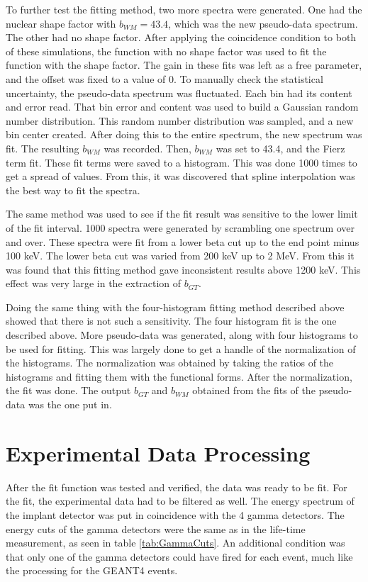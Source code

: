 \documentclass[../MaxHughesThesis.tex]{subfiles}
\begin{document}
To further test the fitting method, two more spectra were generated.
One had the nuclear shape factor with $b_{WM} = 43.4$, which was the new pseudo-data spectrum.  
The other had no shape factor.
After applying the coincidence condition to both of these simulations, the function with no shape factor was used to fit the function with the shape factor. 
The gain in these fits was left as a free parameter, and the offset was fixed to a value of 0. 
To manually check the statistical uncertainty, the pseudo-data spectrum was fluctuated.
Each bin had its content and error read. 
That bin error and content was used to build a Gaussian random number distribution.
This random number distribution was sampled, and a new bin center created.
After doing this to the entire spectrum, the new spectrum was fit.
The resulting $b_{WM}$ was recorded.
Then, $b_{WM}$ was set to 43.4, and the Fierz term fit. 
These fit terms were saved to a histogram.
This was done 1000 times to get a spread of values.
From this, it was discovered that spline interpolation was the best way to fit the spectra.

The same method was used to see if the fit result was sensitive to the lower limit of the fit interval. 
1000 spectra were generated by scrambling one spectrum over and over.
These spectra were fit from a lower beta cut up to the end point minus 100 keV.
The lower beta cut was varied from 200 keV up to 2 MeV.
From this it was found that this fitting method gave inconsistent results above 1200 keV. 
This effect was very large in the extraction of $b_{GT}$.

Doing the same thing with the four-histogram fitting method described above showed that there is not such a sensitivity.
The four histogram fit is the one described above. 
More pseudo-data was generated, along with four histograms to be used for fitting.
This was largely done to get a handle of the normalization of the histograms.
The normalization was obtained by taking the ratios of the histograms and fitting them with the functional forms. 
After the normalization, the fit was done.
The output $b_{GT}$ and $b_{WM}$ obtained from the fits of the pseudo-data was the one put in.

\section{Experimental Data Processing}
After the fit function was tested and verified, the data was ready to be fit. 
For the fit, the experimental data had to be filtered as well. 
The energy spectrum of the implant detector was put in coincidence with the 4 gamma detectors.
The energy cuts of the gamma detectors were the same as in the life-time measurement, as seen in table \ref{tab:GammaCuts}.
An additional condition was that only one of the gamma detectors could have fired for each event, much like the processing for the GEANT4 events.
\end{document}
